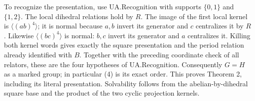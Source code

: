 To recognize the presentation, use UA.Recognition with supports
$\{0,1\}$ and $\{1,2\}$. The local dihedral relations hold by $R$.
The image of the first local kernel is $\langle(ab)^4\rangle$; it is
normal because $a,b$ invert its generator and $c$ centralizes it by
$R$. Likewise $\langle(bc)^4\rangle$ is normal: $b,c$ invert its
generator and $a$ centralizes it. Killing both kernel words gives
exactly the square presentation and the period relation already
identified with $B$. Together with the preceding coordinate check of
all relators, these are the four hypotheses of UA.Recognition.
Consequently $G=H$ as a marked group; in particular (4) is its exact
order. This proves Theorem 2, including its literal presentation.
Solvability follows from the abelian-by-dihedral square base and the
product of the two cyclic projection kernels.
